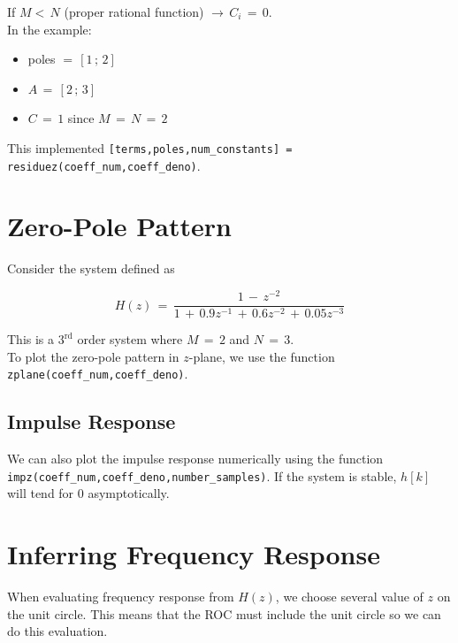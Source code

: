 If $M< \, N$ (proper rational function) $\rightarrow \, C_i \, = \, 0$.\\

\newpage
In the example:

\begin{itemize}
    \item poles $= \, [1 \, ; \,  2]$
    
    \item $A \, = \, [2 \, ; \, 3]$
    
    \item $C \, = \, 1$ since $M \, = \, N \, = \, 2$
    
\end{itemize}

This implemented \verb|[terms,poles,num_constants] = residuez(coeff_num,coeff_deno)|.


\section{Zero-Pole Pattern}

Consider the system defined as

\begin{equation}
  H(z) \, = \, \displaystyle\frac{1 \, -  \, z^{-2}}{1 \, + \,  0.9 z^{-1} \, + \,  0.6 z^{-2} \, + \, 0.05 z^{-3}} 
\end{equation}

This is a $\mathrm{3}^\mathrm{rd}$ order system where $M \, = \, 2$ and $N \, = \, 3$.\\

To plot the zero-pole pattern in $z$-plane, we use the function \verb|zplane(coeff_num,coeff_deno)|.\\

\subsection{Impulse Response}

We can also plot the impulse response numerically using the function \verb|impz(coeff_num,coeff_deno,number_samples)|. If the system is stable, $h[k]$ will tend for 0 asymptotically. 

\section{Inferring Frequency Response}

When evaluating frequency response from $H(z)$, we choose several value of $z$ on the unit circle. This means that the ROC must include the unit circle so we can do this evaluation.\\

